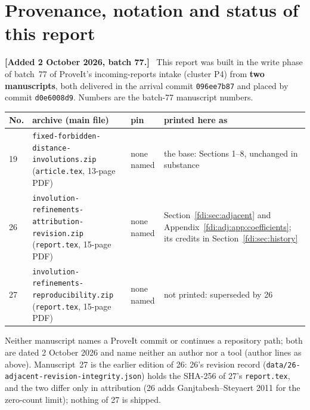 \documentclass[11pt,letterpaper]{article}
\theoremstyle{remark}\newtheorem{remark}[theorem]{Remark}
\newenvironment{mergenote}[1][2 October 2026, batch 77]{\par\smallskip\begingroup\small\noindent\textbf{[Added #1.]}\ }{\endgroup\par\smallskip}
\begin{document}
{\small\setlength{\parskip}{0pt}\tableofcontents}

\section*{Provenance, notation and status of this report}
\label{fdi:sec:provenance}
\begin{mergenote}
This report was built in the write phase of batch~77 of ProveIt's incoming-reports intake (cluster P4) from \textbf{two manuscripts}, both delivered in the arrival commit \texttt{096ee7b87} and placed by commit \texttt{d0e6008d9}. Numbers are the batch-77 manuscript numbers.
\begin{center}\small
\begin{tabular}{@{}l>{\raggedright\arraybackslash}p{5.6cm}>{\raggedright\arraybackslash}p{1.7cm}>{\raggedright\arraybackslash}p{6.4cm}@{}}
\toprule
No.&archive (main file)&pin&printed here as\\
\midrule
19&\texttt{fixed-forbidden-\allowbreak distance-\allowbreak involutions.zip} (\texttt{article.tex}, 13-page PDF)&none named&the base: Sections 1--8, unchanged in substance\\
26&\texttt{involution-\allowbreak refinements-\allowbreak attribution-\allowbreak revision.zip} (\texttt{report.tex}, 15-page PDF)&none named&Section~\ref{fdi:sec:adjacent} and Appendix~\ref{fdi:adj:app:coefficients}; its credits in Section~\ref{fdi:sec:history}\\
27&\texttt{involution-\allowbreak refinements-\allowbreak reproducibility.zip} (\texttt{report.tex}, 15-page PDF)&none named&not printed: superseded by 26\\
\bottomrule
\end{tabular}
\end{center}
Neither manuscript names a ProveIt commit or continues a repository path; both are dated 2 October 2026 and name neither an author nor a tool (author lines as above). Manuscript~27 is the earlier edition of 26: 26's revision record (\texttt{data/26-adjacent-revision-integrity.json}) holds the SHA-256 of 27's \texttt{report.tex}, and the two differ only in attribution (26 adds Ganjtabesh--Steyaert 2011 for the zero-count limit); nothing of 27 is shipped.


\end{mergenote}
\end{document}
